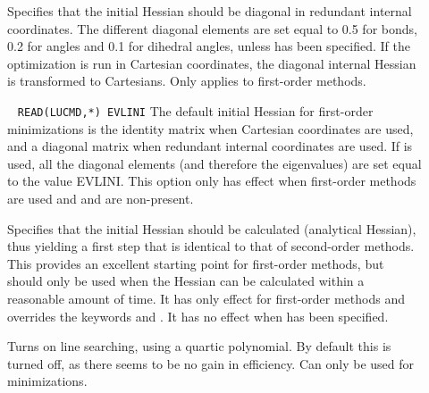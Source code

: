 \begin{description}
\item[]
Specifies that the initial Hessian
should be diagonal in redundant internal coordinates. The different diagonal
elements are set equal to 0.5 for bonds, 0.2 for angles and 0.1 for
dihedral angles, unless  has been specified. If the
optimization is run in Cartesian coordinates, the diagonal internal
Hessian is transformed to Cartesians. Only applies to first-order
methods.

\item[]\verb| |
\newline
\verb|READ(LUCMD,*) EVLINI|
The default initial Hessian for first-order
minimizations is the
identity matrix when Cartesian coordinates are used, and a diagonal
matrix when redundant internal coordinates are used. If 
is used, all the diagonal elements (and therefore the eigenvalues) are
set equal to the value EVLINI. This option only has effect when
first-order methods are used and  and  are
non-present.

\item[]
Specifies that the initial Hessian should be
calculated (analytical Hessian), thus yielding a first step that is
identical to that of second-order methods. This provides an excellent starting
point for first-order methods, but should only be used when the
Hessian can be calculated within a reasonable amount of time. It has only
effect for first-order methods and overrides the keywords
 and . It has no effect when  has
been specified.


\item[]
Turns on line searching,
using a quartic polynomial. By default this
is turned off, as there seems to be no gain in efficiency. Can only be
used for minimizations.


\end{description}
